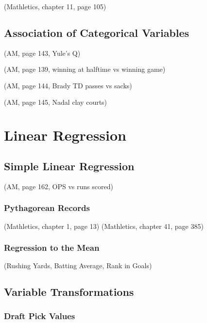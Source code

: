 \documentclass[
  11pt,
]{book}
\theoremstyle{definition}
\theoremstyle{definition}
\theoremstyle{definition}
\theoremstyle{definition}
\theoremstyle{remark}
\begin{document}
(Mathletics, chapter 11, page 105)

\hypertarget{association-of-categorical-variables}{%
\section{Association of Categorical Variables}\label{association-of-categorical-variables}}

(AM, page 143, Yule's Q)

(AM, page 139, winning at halftime vs winning game)

(AM, page 144, Brady TD passes vs sacks)

(AM, page 145, Nadal clay courts)

\hypertarget{linear-regression}{%
\chapter{Linear Regression}\label{linear-regression}}

\hypertarget{simple-linear-regression}{%
\section{Simple Linear Regression}\label{simple-linear-regression}}

(AM, page 162, OPS vs runs scored)

\hypertarget{pythagorean-records}{%
\subsection{Pythagorean Records}\label{pythagorean-records}}

(Mathletics, chapter 1, page 13)
(Mathletics, chapter 41, page 385)

\hypertarget{regression-to-the-mean}{%
\subsection{Regression to the Mean}\label{regression-to-the-mean}}

(Rushing Yards, Batting Average, Rank in Goals)

\hypertarget{variable-transformations}{%
\section{Variable Transformations}\label{variable-transformations}}

\hypertarget{draft-pick-values}{%
\subsection{Draft Pick Values}\label{draft-pick-values}}
\end{document}
